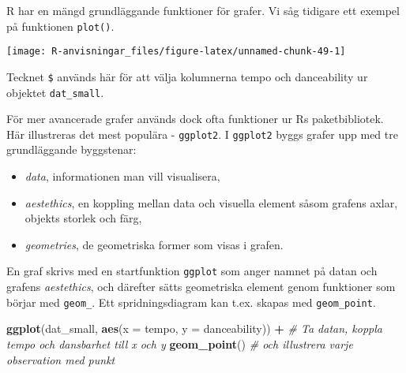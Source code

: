 \documentclass[
]{book}
\newenvironment{Shaded}{\begin{snugshade}}{\end{snugshade}}
\newcommand{\AttributeTok}[1]{\textcolor[rgb]{0.13,0.29,0.53}{#1}}
\newcommand{\CommentTok}[1]{\textcolor[rgb]{0.56,0.35,0.01}{\textit{#1}}}
\newcommand{\FunctionTok}[1]{\textcolor[rgb]{0.13,0.29,0.53}{\textbf{#1}}}
\newcommand{\NormalTok}[1]{#1}
\newcommand{\SpecialCharTok}[1]{\textcolor[rgb]{0.81,0.36,0.00}{\textbf{#1}}}
\providecommand{\tightlist}{%
  \setlength{\itemsep}{0pt}\setlength{\parskip}{0pt}}
\theoremstyle{definition}
\theoremstyle{definition}
\theoremstyle{definition}
\theoremstyle{definition}
\theoremstyle{remark}
\begin{document}
R har en mängd grundläggande funktioner för grafer. Vi såg tidigare ett exempel på funktionen \texttt{plot()}.

\begin{Shaded}
\end{Shaded}

\begin{center}\texttt{[image: R-anvisningar\_files/figure-latex/unnamed-chunk-49-1]} \end{center}

Tecknet \texttt{\$} används här för att välja kolumnerna tempo och danceability ur objektet \texttt{dat\_small}.

För mer avancerade grafer används dock ofta funktioner ur Rs paketbibliotek. Här illustreras det mest populära - \texttt{ggplot2}. I \texttt{ggplot2} byggs grafer upp med tre grundläggande byggstenar:

\begin{itemize}
\tightlist
\item
  \emph{data}, informationen man vill visualisera,
\item
  \emph{aestethics}, en koppling mellan data och visuella element såsom grafens axlar, objekts storlek och färg,
\item
  \emph{geometries}, de geometriska former som visas i grafen.
\end{itemize}

En graf skrivs med en startfunktion \texttt{ggplot} som anger namnet på datan och grafens \emph{aestethics}, och därefter sätts geometriska element genom funktioner som börjar med \texttt{geom\_}. Ett spridningsdiagram kan t.ex. skapas med \texttt{geom\_point}.

\begin{Shaded}
\begin{Highlighting}[]
\FunctionTok{ggplot}\NormalTok{(dat\_small, }\FunctionTok{aes}\NormalTok{(}\AttributeTok{x =}\NormalTok{ tempo, }\AttributeTok{y =}\NormalTok{ danceability)) }\SpecialCharTok{+}  \CommentTok{\# Ta datan, koppla tempo och dansbarhet till x och y}
  \FunctionTok{geom\_point}\NormalTok{()                                         }\CommentTok{\# och illustrera varje observation med punkt}
\end{Highlighting}
\end{Shaded}
\end{document}
